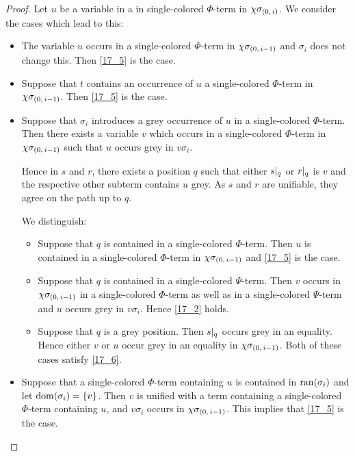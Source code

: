 \documentclass[,%
	draft=false,%
	numbers=noendperiod
	12pt,
	a4paper,
	oneside,%
	openany,
]{memoir}
\newcommand{\inv}{\ensuremath{\chi}}
\begin{document}
\begin{proof}
	Let $u$ be a variable in a in single-colored $\Phi$-term in $\inv\sigmazi$. 
	We consider the cases which lead to this:
	\begin{itemize}
		\item The variable $u$ occurs in a single-colored $\Phi$-term in $\inv\sigmazmi$ and $\sigma_i$ does not change this.
			Then \ref{17_5} is the case.

		\item
			Suppose that $t$ contains an occurrence of $u$ a single-colored $\Phi$-term in $\inv\sigmazmi$.
			Then \ref{17_5} is the case.


		\item
			Suppose that $\sigma_i$ introduces a grey occurrence of $u$ in a single-colored $\Phi$-term.
			Then there exists a variable $v$ which occurs in a single-colored $\Phi$-term in $\inv\sigmazmi$ such that $u$ occurs grey in $v\sigma_i$.

			Hence in $s$ and $r$, there exists a position $q$ such that 
			either $s|_{q}$ or $r|_{q}$ is $v$ and the respective other subterm contains $u$ grey. 
			As $s$ and $r$ are unifiable, they agree on the path up to $q$.

			We distinguish:
			\begin{itemize}
				\item
					Suppose that $q$ is contained in a single-colored $\Phi$-term.
					Then $u$ is contained in a single-colored $\Phi$-term in $\inv\sigmazmi$ and \ref{17_5} is the case.

				\item
					Suppose that $q$ is contained in a single-colored $\Psi$-term.
					Then $v$ occurs in $\inv\sigmazmi$ in a single-colored $\Phi$-term as well as in a single-colored $\Psi$-term and $u$ occurs grey in $v\sigma_i$. Hence \ref{17_2} holds.

				\item 
					Suppose that $q$ is a grey position.
					Then $s|_{q}$ occurs grey in an equality.
					Hence either $v$ or $u$ occur grey in an equality in $\inv\sigmazmi$.
					Both of these cases satisfy \ref{17_6}.


			\end{itemize}


		\item 
			Suppose that a single-colored $\Phi$-term containing $u$ is contained in $\operatorname{ran}(\sigma_i)$ and let $\operatorname{dom}(\sigma_i) = \{v\}$.
			Then $v$ is unified with a term containing a single-colored $\Phi$-term containing $u$, and $v\sigma_i$ occurs in $\inv\sigmazmi$. This implies that \ref{17_5} is the case.
			\qedhere


	\end{itemize}
\end{proof}
\end{document}
